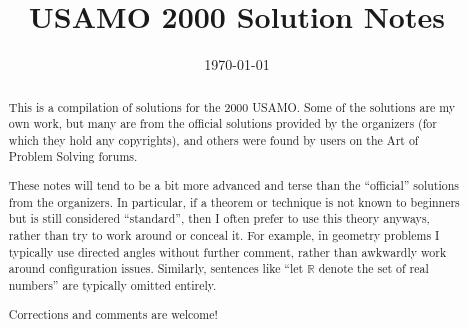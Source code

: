 \documentclass[11pt]{scrartcl}
\title{USAMO 2000 Solution Notes}
\date{\today}
\begin{document}
\maketitle

\begin{abstract}
This is a compilation of solutions
for the 2000 USAMO.
Some of the solutions are my own work,
but many are from the official solutions provided by the organizers
(for which they hold any copyrights),
and others were found by users on the Art of Problem Solving forums.

These notes will tend to be a bit more advanced and terse than the ``official''
solutions from the organizers.
In particular, if a theorem or technique is not known to beginners
but is still considered ``standard'', then I often prefer to
use this theory anyways, rather than try to work around or conceal it.
For example, in geometry problems I typically use directed angles
without further comment, rather than awkwardly work around configuration issues.
Similarly, sentences like ``let $\mathbb{R}$ denote the set of real numbers''
are typically omitted entirely.

Corrections and comments are welcome!
\end{abstract}

\tableofcontents
\newpage

\addtocounter{section}{-1}
\end{document}
